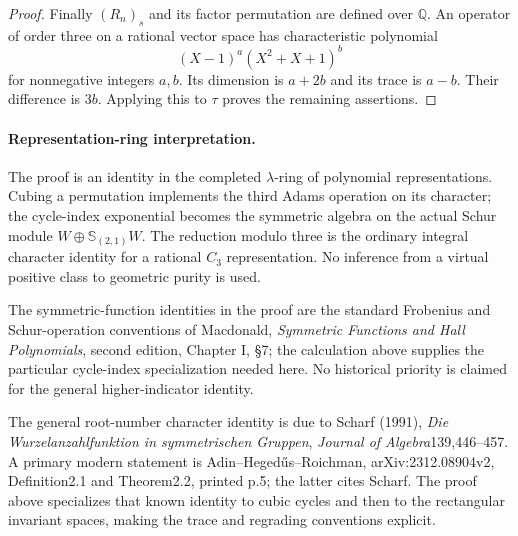 \begin{proof}
Finally $(R_n)_s$ and its factor permutation are defined over
$\mathbb Q$.  An operator of order three on a rational vector
space has characteristic polynomial
\[
                         (X-1)^a(X^2+X+1)^b
\]
for nonnegative integers $a,b$.  Its dimension is $a+2b$ and
its trace is $a-b$.  Their difference is $3b$.  Applying this
to $\tau$ proves the remaining assertions.
\end{proof}

\paragraph{Representation-ring interpretation.}
The proof is an identity in the completed $\lambda$-ring of
polynomial representations.  Cubing a permutation implements
the third Adams operation on its character; the cycle-index
exponential becomes the symmetric algebra on the actual Schur
module $W\oplus\mathbb S_{(2,1)}W$.  The reduction modulo three
is the ordinary integral character identity for a rational
$C_3$ representation.  No inference from a virtual positive
class to geometric purity is used.

The symmetric-function identities in the proof are the standard
Frobenius and Schur-operation conventions of Macdonald,
\emph{Symmetric Functions and Hall Polynomials}, second edition,
Chapter I, \S7; the calculation above supplies the particular
cycle-index specialization needed here.  No historical priority
is claimed for the general higher-indicator identity.

The general root-number character identity is due to Scharf (1991),
\emph{Die Wurzelanzahlfunktion in symmetrischen Gruppen},
\emph{Journal of Algebra}139,446--457.  A primary modern statement
is Adin--Heged\H us--Roichman, arXiv:2312.08904v2,
Definition2.1 and Theorem2.2, printed p.5; the latter cites Scharf.
The proof above specializes that known identity to cubic cycles and
then to the rectangular invariant spaces, making the trace and
regrading conventions explicit.
